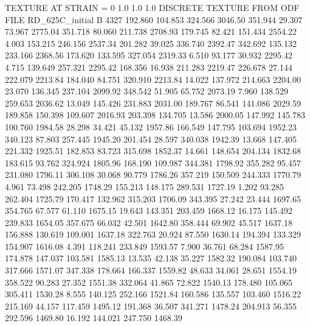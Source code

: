 TEXTURE AT STRAIN = 0
1.0   1.0   1.0
DISCRETE TEXTURE FROM ODF FILE RD_625C_initial
B 4327
 192.860  104.853  324.566      3046.50
 351.944   29.307   73.967      2775.04
 351.718   80.060  211.738      2708.93
 179.745   82.421  151.434      2554.22
   4.003  153.215  246.156      2537.34
 201.282   39.025  336.740      2392.47
 342.692  135.132  233.166      2368.56
 173.620  133.595  327.054      2319.33
   6.510   93.177   30.932      2295.42
   4.715  139.649  257.321      2295.42
 168.356   16.938  211.283      2219.47
 226.678   27.144  222.079      2213.84
 184.040   84.751  320.910      2213.84
  14.022  137.972  214.663      2204.00
  23.070  136.345  237.104      2099.92
 348.542   51.905   65.752      2073.19
   7.960  138.529  259.653      2036.62
  13.049  145.426  231.883      2031.00
 189.767   86.541  141.086      2029.59
 189.858  150.398  109.607      2016.93
 203.398  134.705   13.586      2000.05
 147.992  145.783  100.760      1984.58
  28.298   34.421   45.132      1957.86
 166.549  147.795  103.694      1952.23
 340.123   87.803  257.445      1945.20
 201.454   28.597  340.038      1942.39
  13.668  147.405  221.332      1925.51
 182.853   83.723  315.698      1852.37
  14.661  148.654  204.134      1832.68
 183.615   93.762  324.924      1805.96
 168.190  109.987  344.381      1798.92
 355.282   95.457  231.080      1796.11
 306.108   30.068   90.779      1786.26
 357.219  150.509  244.333      1770.79
   4.961   73.498  242.205      1748.29
 155.213  148.175  289.531      1727.19
   1.202   93.285  262.404      1725.79
 170.417  132.962  315.203      1706.09
 343.395   27.242   23.444      1697.65
 354.765   67.577   61.110      1675.15
  19.643  143.351  203.459      1668.12
  16.175  145.492  239.833      1654.05
 357.675   66.032   42.501      1642.80
 358.444   69.902   45.517      1637.18
 156.888  130.619  109.001      1637.18
 322.763   20.924   87.550      1630.14
 194.394  133.329  154.907      1616.08
   4.391  118.241  233.849      1593.57
   7.900   36.761   68.284      1587.95
 174.878  147.037  103.581      1585.13
  13.535   42.138   35.227      1582.32
 190.084  103.740  317.666      1571.07
 347.338  178.664  166.337      1559.82
  48.633   34.061   28.651      1554.19
 358.522   90.283   27.352      1551.38
 332.064   41.865   72.822      1540.13
 178.480  105.065  305.411      1530.28
   8.555  140.125  252.166      1521.84
 160.586  135.557  103.460      1516.22
 215.169   44.157  117.459      1495.12
 191.368   36.507  341.271      1478.24
 204.913   56.355  292.596      1469.80
  16.192  144.021  247.750      1468.39
